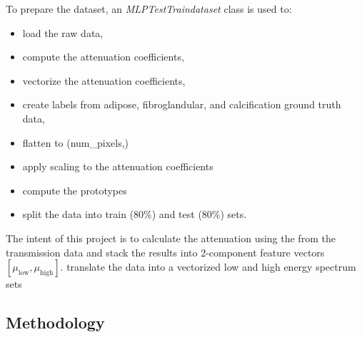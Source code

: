 To prepare the dataset, an \emph{MLPTestTraindataset} class is used to:

\begin{itemize}
    \item load the raw data,
    \item compute the attenuation coefficients,
    \item vectorize the attenuation coefficients,
    \item create labels from adipose, fibroglandular, and calcification ground truth data,
    \item flatten to (num\_pixels,)
    \item apply scaling to the attenuation coefficients
    \item compute the prototypes
    \item split the data into train (80\%) and test (80\%) sets.
\end{itemize}

The intent of this project is to calculate the attenuation using the from the transmission data and stack the results
into 2-component feature vectors $[\mu_{\text{low}}, \mu_{\text{high}}]$.
translate the data into a vectorized low and high energy spectrum sets


\subsection{Methodology}\label{subsec:price_prediction_methodology}

